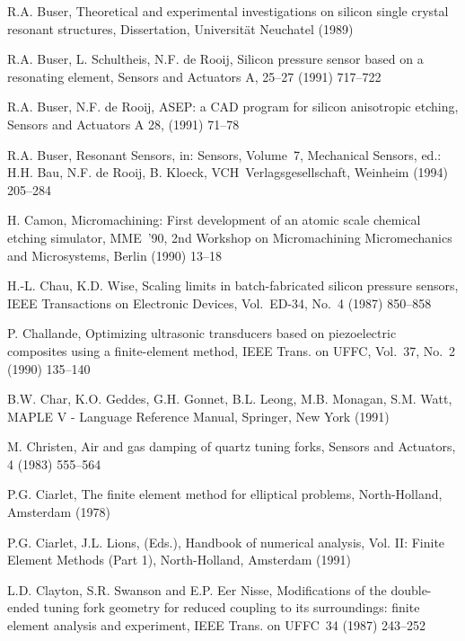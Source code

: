 \begin{thebibliography}{xxx}
 R.A. Buser, Theoretical and experimental investigations on silicon single
 crystal resonant structures, Dissertation, Universität Neuchatel (1989)

 R.A. Buser, L. Schultheis, N.F. de Rooij, Silicon pressure sensor based on a
 resonating element, Sensors and Actuators A, 25--27 (1991) 717--722

 R.A. Buser, N.F. de Rooij, {\sf ASEP}: a CAD program for silicon
 anisotropic etching, Sensors and Actuators A 28, (1991) 71--78

 R.A. Buser, Resonant Sensors, in: Sensors, Volume~7, Mechanical Sensors,
 ed.: H.H. Bau, N.F. de Rooij, B. Kloeck, VCH~Verlagsgesellschaft,
 Weinheim (1994) 205--284

 H. Camon, Micromachining: First development of an atomic scale chemical
 etching simulator, MME~'90, 2nd Workshop on Micromachining Micromechanics
 and Microsystems, Berlin (1990) 13--18

 H.-L. Chau, K.D. Wise, Scaling limits in batch-fabricated silicon pressure
 sensors, IEEE Transactions on Electronic Devices, Vol.~ED-34, No.~4
 (1987) 850--858

 P. Challande, Optimizing ultrasonic transducers based on piezoelectric
 composites using a finite-element method, IEEE Trans. on UFFC, Vol.~37,
 No.~2 (1990) 135--140

 B.W. Char, K.O. Geddes, G.H. Gonnet, B.L. Leong, M.B. Monagan, S.M. Watt,
 {\sf MAPLE V} - Language Reference Manual, Springer, New York (1991)

 M. Christen, Air and gas damping of quartz tuning forks, Sensors and
 Actuators, 4 (1983) 555--564

 P.G. Ciarlet, The finite element method for elliptical problems,
 North-Holland, Amsterdam (1978)

 P.G. Ciarlet, J.L. Lions, (Eds.), Handbook of numerical analysis,
 Vol. II: Finite Element Methods (Part 1), North-Holland, Amsterdam (1991)

 L.D. Clayton, S.R. Swanson and E.P. Eer Nisse, Modifications of the
 double-ended tuning fork geometry for reduced coupling to its surroundings:
 finite element analysis and experiment, IEEE Trans. on UFFC~34
 (1987) 243--252


\end{thebibliography}
